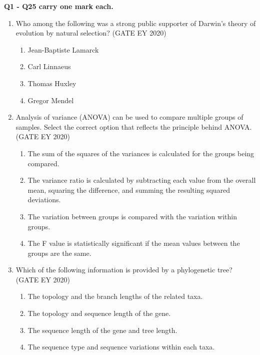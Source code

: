 \noindent \textbf{Q1 - Q25 carry one mark each.}
\begin{enumerate}
\item Who among the following was a strong public supporter of Darwin's theory of evolution by natural selection? \hfill {(GATE EY 2020)}

\begin{multicols}{2}
\begin{enumerate}
\item Jean-Baptiste Lamarck
\item Carl Linnaeus
\item Thomas Huxley
\item Gregor Mendel
\end{enumerate}
\end{multicols}

\item Analysis of variance (ANOVA) can be used to compare multiple groups of samples. Select the correct option that reflects the principle behind ANOVA. \hfill {(GATE EY 2020)}

\begin{multicols}{2}
\begin{enumerate}
\item The sum of the squares of the variances is calculated for the groups being compared.
\item The variance ratio is calculated by subtracting each value from the overall mean, squaring the difference, and summing the resulting squared deviations.
\item The variation between groups is compared with the variation within groups.
\item The F value is statistically significant if the mean values between the groups are the same.
\end{enumerate}
\end{multicols}

\item Which of the following information is provided by a phylogenetic tree? \hfill {(GATE EY 2020)}

\begin{multicols}{2}
\begin{enumerate}
\item The topology and the branch lengths of the related taxa.
\item The topology and sequence length of the gene.
\item The sequence length of the gene and tree length.
\item The sequence type and sequence variations within each taxa.
\end{enumerate}
\end{multicols}


\end{enumerate}
